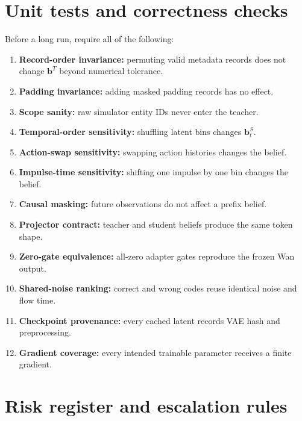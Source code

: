 \documentclass[11pt]{article}
\newcommand{\bvec}{\bm b}
\begin{document}
\section{Unit tests and correctness checks}

Before a long run, require all of the following:
\begin{enumerate}
  \item \textbf{Record-order invariance:} permuting valid metadata records does
  not change $\bvec^T$ beyond numerical tolerance.
  \item \textbf{Padding invariance:} adding masked padding records has no effect.
  \item \textbf{Scope sanity:} raw simulator entity IDs never enter the teacher.
  \item \textbf{Temporal-order sensitivity:} shuffling latent bins changes $\bvec_t^S$.
  \item \textbf{Action-swap sensitivity:} swapping action histories changes the belief.
  \item \textbf{Impulse-time sensitivity:} shifting one impulse by one bin changes the belief.
  \item \textbf{Causal masking:} future observations do not affect a prefix belief.
  \item \textbf{Projector contract:} teacher and student beliefs produce the same token shape.
  \item \textbf{Zero-gate equivalence:} all-zero adapter gates reproduce the frozen Wan output.
  \item \textbf{Shared-noise ranking:} correct and wrong codes reuse identical noise and flow time.
  \item \textbf{Checkpoint provenance:} every cached latent records VAE hash and preprocessing.
  \item \textbf{Gradient coverage:} every intended trainable parameter receives a finite gradient.
\end{enumerate}

\section{Risk register and escalation rules}
\end{document}
